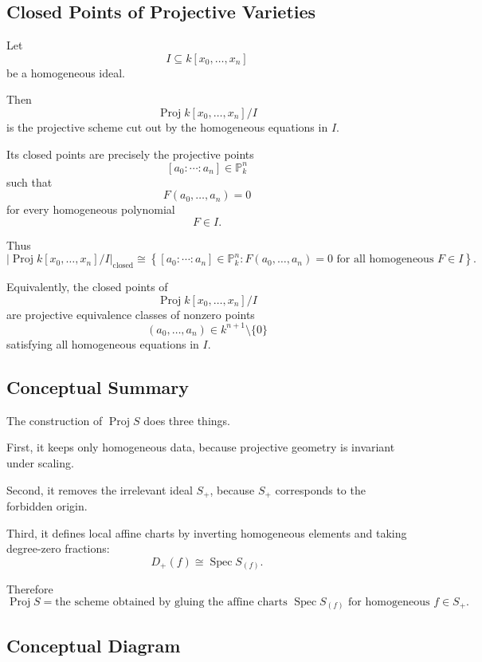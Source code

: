 \documentclass[12pt,a4paper]{article}
\DeclareMathOperator{\Spec}{Spec}
\DeclareMathOperator{\Proj}{Proj}
\theoremstyle{notespace}
\begin{document}
\subsection{Closed Points of Projective Varieties}

Let
\[
I\subseteq k[x_0,\dots,x_n]
\]
be a homogeneous ideal.

Then
\[
\Proj k[x_0,\dots,x_n]/I
\]
is the projective scheme cut out by the homogeneous equations in \(I\).

Its closed points are precisely the projective points
\[
[a_0:\cdots:a_n]\in\mathbb P_k^n
\]
such that
\[
F(a_0,\dots,a_n)=0
\]
for every homogeneous polynomial
\[
F\in I.
\]

Thus
\[
\boxed{
	\left|
	\Proj k[x_0,\dots,x_n]/I
	\right|_{\mathrm{closed}}
	\cong
	\left\{
	[a_0:\cdots:a_n]\in\mathbb P_k^n:
	F(a_0,\dots,a_n)=0
	\text{ for all homogeneous }F\in I
	\right\}.
}
\]

Equivalently, the closed points of
\[
\Proj k[x_0,\dots,x_n]/I
\]
are projective equivalence classes of nonzero points
\[
(a_0,\dots,a_n)\in k^{n+1}\setminus\{0\}
\]
satisfying all homogeneous equations in \(I\).

\subsection{Conceptual Summary}

The construction of \(\Proj S\) does three things.

First, it keeps only homogeneous data, because projective geometry is invariant under
scaling.

Second, it removes the irrelevant ideal \(S_+\), because \(S_+\) corresponds to the
forbidden origin.

Third, it defines local affine charts by inverting homogeneous elements and taking
degree-zero fractions:
\[
D_+(f)\cong \Spec S_{(f)}.
\]

Therefore
\[
\boxed{
	\Proj S
	=
	\text{the scheme obtained by gluing the affine charts }
	\Spec S_{(f)}
	\text{ for homogeneous }f\in S_+.
}
\]

\subsection{Conceptual Diagram}
\end{document}
